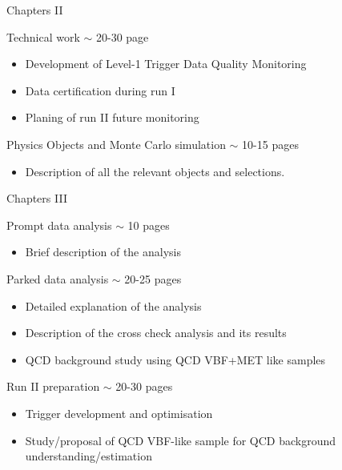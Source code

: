 \documentclass[8pt]{beamer}
\begin{document}
\begin{frame}{Chapters II}

\begin{block}{Technical work $\sim$ 20-30 page}

\begin{itemize}
  \item Development of Level-1 Trigger Data Quality Monitoring 
  \item Data certification during run I
  \item Planing of run II future monitoring 
\end{itemize}

\end{block}

\begin{block}{Physics Objects and Monte Carlo simulation $\sim$ 10-15 pages}

\begin{itemize}
  \item Description of all the relevant objects and selections.
\end{itemize}

\end{block}

\end{frame}

\begin{frame}{Chapters III}

\begin{block}{Prompt data analysis $\sim$ 10 pages}

\begin{itemize}
  \item Brief description of the analysis 
\end{itemize}

\end{block}

\begin{block}{Parked data analysis $\sim$ 20-25 pages}

\begin{itemize}
  \item Detailed explanation of the analysis
  \item Description of the cross check analysis and its results
  \item QCD background study using QCD VBF+MET like samples 
\end{itemize}

\end{block}

\begin{block}{Run II preparation $\sim$ 20-30 pages}

\begin{itemize}
  \item Trigger development and optimisation
  \item Study/proposal of QCD VBF-like sample for QCD background understanding/estimation
\end{itemize}

\end{block}

\end{frame}
\end{document}
